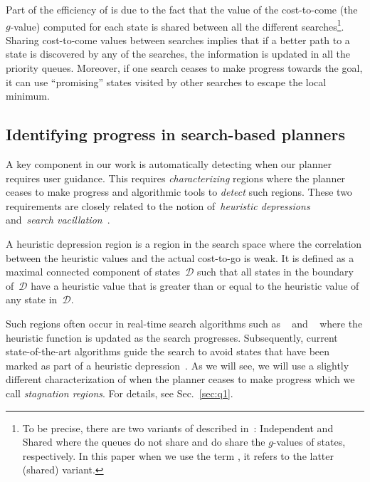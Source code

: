 \documentclass{article}
\begin{document}
Part of the efficiency of \mhastar is due to the fact that the value of the cost-to-come (the $g$-value) computed for each state is shared between all the different searches\footnote{To be precise, there are two variants of \mhastar described in~\cite{ASNHL16}: Independent and Shared \mhastar where the queues do not share and do share the $g$-values of states, respectively. In this paper when we use the term \mhastar, it refers to the latter (shared) variant.}.
Sharing cost-to-come values between searches implies that if a better path to a state is discovered by any of the searches, the information is updated in all the
priority queues. 
Moreover, if one search ceases to make progress towards the goal, it can use ``promising'' states visited by other searches to escape the local minimum.

\subsection{Identifying progress in search-based planners}

A key component in our work is automatically detecting when our planner requires user guidance.
This requires \emph{characterizing} regions where the planner ceases to make progress and algorithmic tools to \emph{detect} such regions. 
These two requirements are closely related to the notion of~\emph{heuristic depressions}~\cite{I92}
and~\emph{search vacillation}~\cite{DTR11,BRD13}.

A heuristic depression region is a  region in the search space where the correlation between the heuristic values and the actual cost-to-go is weak.
It is defined as a maximal connected component of states~$\mathcal{D}$ such that all states in the boundary of~$\mathcal{D}$ have a heuristic value that is greater than or equal to the heuristic value of any state in~$\mathcal{D}$.

Such regions often occur in real-time search algorithms such as ~\cite{K90} and ~\cite{KS09} where the heuristic function is updated as the search progresses.
Subsequently, current state-of-the-art algorithms  guide the search to avoid states that have been marked as part of a heuristic depression~\cite{HB12}.
As we will see, we will use a slightly different characterization of when the planner ceases to make progress which we call \emph{stagnation regions}. For details, see Sec.~\ref{sec:q1}. 
\end{document}
